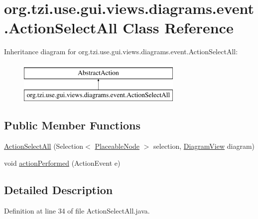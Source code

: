 \hypertarget{classorg_1_1tzi_1_1use_1_1gui_1_1views_1_1diagrams_1_1event_1_1_action_select_all}{\section{org.\-tzi.\-use.\-gui.\-views.\-diagrams.\-event.\-Action\-Select\-All Class Reference}
\label{classorg_1_1tzi_1_1use_1_1gui_1_1views_1_1diagrams_1_1event_1_1_action_select_all}
}
Inheritance diagram for org.\-tzi.\-use.\-gui.\-views.\-diagrams.\-event.\-Action\-Select\-All\-:\begin{figure}[H]
\begin{center}
\leavevmode
\includegraphics[height=2.000000cm]{classorg_1_1tzi_1_1use_1_1gui_1_1views_1_1diagrams_1_1event_1_1_action_select_all}
\end{center}
\end{figure}
\subsection*{Public Member Functions}
\begin{DoxyCompactItemize}
\item 
\hyperlink{classorg_1_1tzi_1_1use_1_1gui_1_1views_1_1diagrams_1_1event_1_1_action_select_all_a1aa66aeb8b19e161814f2f825c2b950e}{Action\-Select\-All} (Selection$<$ \hyperlink{classorg_1_1tzi_1_1use_1_1gui_1_1views_1_1diagrams_1_1elements_1_1_placeable_node}{Placeable\-Node} $>$ selection, \hyperlink{classorg_1_1tzi_1_1use_1_1gui_1_1views_1_1diagrams_1_1_diagram_view}{Diagram\-View} diagram)
\item 
void \hyperlink{classorg_1_1tzi_1_1use_1_1gui_1_1views_1_1diagrams_1_1event_1_1_action_select_all_adbd8b9fc8dbc9f27d3ed8a1b2def1aaf}{action\-Performed} (Action\-Event e)
\end{DoxyCompactItemize}


\subsection{Detailed Description}


Definition at line 34 of file Action\-Select\-All.\-java.



